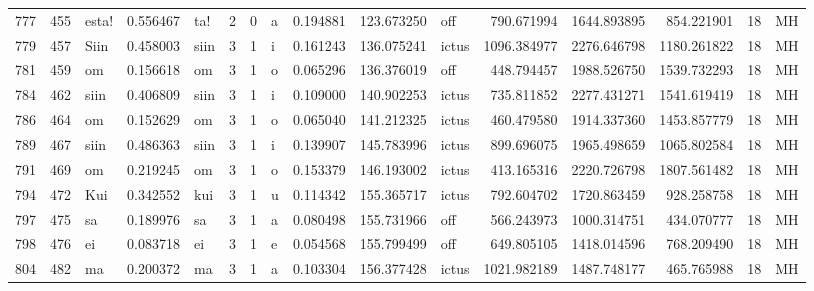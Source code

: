 \begin{tabular}{lrlrllllrrlrrrll}
777  &         455 &            esta! &  0.556467 &     ta! &        2 &      0 &       a &      0.194881 &    123.673250 &    off &   790.671994 &  1644.893895 &   854.221901 &     18 &        MH \\
779  &         457 &             Siin &  0.458003 &    siin &        3 &      1 &       i &      0.161243 &    136.075241 &  ictus &  1096.384977 &  2276.646798 &  1180.261822 &     18 &        MH \\
781  &         459 &               om &  0.156618 &      om &        3 &      1 &       o &      0.065296 &    136.376019 &    off &   448.794457 &  1988.526750 &  1539.732293 &     18 &        MH \\
784  &         462 &             siin &  0.406809 &    siin &        3 &      1 &       i &      0.109000 &    140.902253 &  ictus &   735.811852 &  2277.431271 &  1541.619419 &     18 &        MH \\
786  &         464 &               om &  0.152629 &      om &        3 &      1 &       o &      0.065040 &    141.212325 &  ictus &   460.479580 &  1914.337360 &  1453.857779 &     18 &        MH \\
789  &         467 &             siin &  0.486363 &    siin &        3 &      1 &       i &      0.139907 &    145.783996 &  ictus &   899.696075 &  1965.498659 &  1065.802584 &     18 &        MH \\
791  &         469 &               om &  0.219245 &      om &        3 &      1 &       o &      0.153379 &    146.193002 &  ictus &   413.165316 &  2220.726798 &  1807.561482 &     18 &        MH \\
794  &         472 &              Kui &  0.342552 &     kui &        3 &      1 &       u &      0.114342 &    155.365717 &  ictus &   792.604702 &  1720.863459 &   928.258758 &     18 &        MH \\
797  &         475 &               sa &  0.189976 &      sa &        3 &      1 &       a &      0.080498 &    155.731966 &    off &   566.243973 &  1000.314751 &   434.070777 &     18 &        MH \\
798  &         476 &               ei &  0.083718 &      ei &        3 &      1 &       e &      0.054568 &    155.799499 &    off &   649.805105 &  1418.014596 &   768.209490 &     18 &        MH \\
804  &         482 &               ma &  0.200372 &      ma &        3 &      1 &       a &      0.103304 &    156.377428 &  ictus &  1021.982189 &  1487.748177 &   465.765988 &     18 &        MH \\

\end{tabular}
